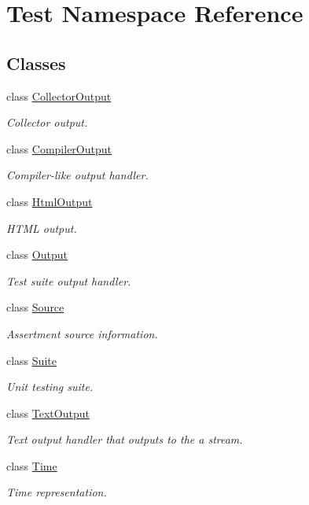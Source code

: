 \hypertarget{namespace_test}{}\section{Test Namespace Reference}
\label{namespace_test}
\subsection*{Classes}
\begin{DoxyCompactItemize}
\item 
class \mbox{\hyperlink{class_test_1_1_collector_output}{Collector\+Output}}
\begin{DoxyCompactList}\small\item\em Collector output. \end{DoxyCompactList}\item 
class \mbox{\hyperlink{class_test_1_1_compiler_output}{Compiler\+Output}}
\begin{DoxyCompactList}\small\item\em Compiler-\/like output handler. \end{DoxyCompactList}\item 
class \mbox{\hyperlink{class_test_1_1_html_output}{Html\+Output}}
\begin{DoxyCompactList}\small\item\em H\+T\+ML output. \end{DoxyCompactList}\item 
class \mbox{\hyperlink{class_test_1_1_output}{Output}}
\begin{DoxyCompactList}\small\item\em Test suite output handler. \end{DoxyCompactList}\item 
class \mbox{\hyperlink{class_test_1_1_source}{Source}}
\begin{DoxyCompactList}\small\item\em Assertment source information. \end{DoxyCompactList}\item 
class \mbox{\hyperlink{class_test_1_1_suite}{Suite}}
\begin{DoxyCompactList}\small\item\em Unit testing suite. \end{DoxyCompactList}\item 
class \mbox{\hyperlink{class_test_1_1_text_output}{Text\+Output}}
\begin{DoxyCompactList}\small\item\em Text output handler that outputs to the a stream. \end{DoxyCompactList}\item 
class \mbox{\hyperlink{class_test_1_1_time}{Time}}
\begin{DoxyCompactList}\small\item\em Time representation. \end{DoxyCompactList}\end{DoxyCompactItemize}

